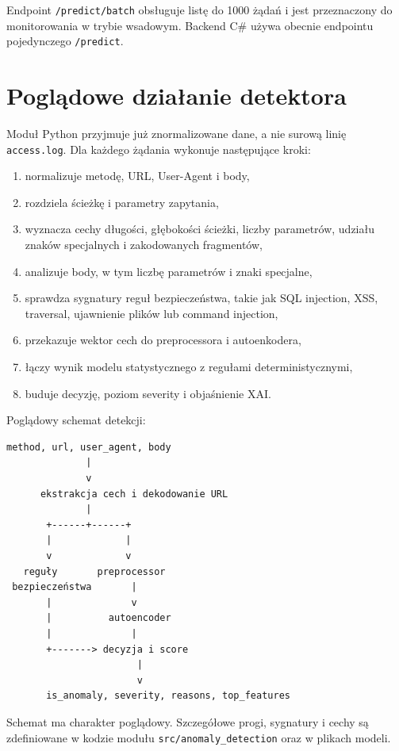 \documentclass[12pt,a4paper]{article}
\newcommand{\code}[1]{\texttt{#1}}
\begin{document}
Endpoint \code{/predict/batch} obsługuje listę do 1000 żądań i jest przeznaczony
do monitorowania w trybie wsadowym. Backend C\# używa obecnie endpointu
pojedynczego \code{/predict}.

\section{Poglądowe działanie detektora}

Moduł Python przyjmuje już znormalizowane dane, a nie surową linię
\code{access.log}. Dla każdego żądania wykonuje następujące kroki:

\begin{enumerate}
    \item normalizuje metodę, URL, User-Agent i body,
    \item rozdziela ścieżkę i parametry zapytania,
    \item wyznacza cechy długości, głębokości ścieżki, liczby parametrów,
    udziału znaków specjalnych i zakodowanych fragmentów,
    \item analizuje body, w tym liczbę parametrów i znaki specjalne,
    \item sprawdza sygnatury reguł bezpieczeństwa, takie jak SQL injection,
    XSS, traversal, ujawnienie plików lub command injection,
    \item przekazuje wektor cech do preprocessora i autoenkodera,
    \item łączy wynik modelu statystycznego z regułami deterministycznymi,
    \item buduje decyzję, poziom severity i objaśnienie XAI.
\end{enumerate}

Poglądowy schemat detekcji:

\begin{verbatim}
method, url, user_agent, body
              |
              v
      ekstrakcja cech i dekodowanie URL
              |
       +------+------+
       |             |
       v             v
   reguły       preprocessor
 bezpieczeństwa       |
       |              v
       |          autoencoder
       |              |
       +-------> decyzja i score
                       |
                       v
       is_anomaly, severity, reasons, top_features
\end{verbatim}

Schemat ma charakter poglądowy. Szczegółowe progi, sygnatury i cechy są
zdefiniowane w kodzie modułu \code{src/anomaly\_detection} oraz w plikach modeli.
\end{document}
